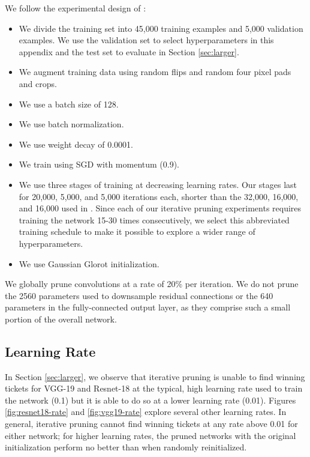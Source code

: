 We follow the experimental design of \citet{resnet}:
\begin{itemize}
\item We divide the training set into 45,000 training examples and 5,000 validation examples. We use the validation set to select hyperparameters in
this appendix and the test set to evaluate in Section \ref{sec:larger}.
\item We augment training data using random flips and random four pixel pads and crops.
\item We use a batch size of 128.
\item We use batch normalization.
\item We use weight decay of 0.0001.
\item We train using SGD with momentum (0.9).
\item We use three stages of training at decreasing learning rates. Our stages last for 20,000, 5,000, and 5,000 iterations each, shorter than the
32,000, 16,000, and 16,000 used in \citet{resnet}. Since each of our iterative pruning experiments requires training the network 15-30 times consecutively, we select
this abbreviated training schedule to make it possible to explore a wider range of hyperparameters.
\item We use Gaussian Glorot initialization.
\end{itemize}

We globally prune convolutions at a rate of 20\% per iteration. 
We do not prune the 2560 parameters used to downsample residual connections or the
640 parameters in the fully-connected output layer, as they comprise such a small portion of the overall network.


\subsection{Learning Rate}

In Section \ref{sec:larger}, we observe that iterative pruning is unable to find winning tickets for VGG-19 and Resnet-18 at the typical, high learning rate used to train the network (0.1) but it is able to do so at a lower learning rate (0.01). Figures \ref{fig:resnet18-rate} and \ref{fig:vgg19-rate} explore several other learning rates. In general, iterative pruning cannot find winning tickets at any rate above 0.01 for either network; for higher learning rates, the pruned networks with the original initialization perform no better than when randomly reinitialized.



